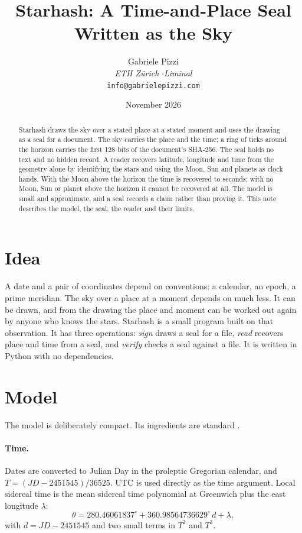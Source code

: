 \documentclass[10pt,twocolumn,a4paper]{article}
\title{\textbf{Starhash: A Time-and-Place Seal Written as the Sky}}
\author{Gabriele Pizzi\\
\textit{ETH Z\"urich} \quad$\cdot$\quad \textit{Liminal}\\
\texttt{info@gabrielepizzi.com}}
\date{November 2026}
\begin{document}
\maketitle

\begin{abstract}
\noindent Starhash draws the sky over a stated place at a stated moment and
uses the drawing as a seal for a document. The sky carries the place and the
time; a ring of ticks around the horizon carries the first 128 bits of the
document's SHA-256. The seal holds no text and no hidden record. A reader
recovers latitude, longitude and time from the geometry alone by identifying
the stars and using the Moon, Sun and planets as clock hands. With the Moon
above the horizon the time is recovered to seconds; with no Moon, Sun or
planet above the horizon it cannot be recovered at all. The model is small
and approximate, and a seal records a claim rather than proving it. This note
describes the model, the seal, the reader and their limits.
\end{abstract}

\section{Idea}

A date and a pair of coordinates depend on conventions: a calendar, an epoch,
a prime meridian. The sky over a place at a moment depends on much less. It
can be drawn, and from the drawing the place and moment can be worked out
again by anyone who knows the stars. Starhash is a small program built on
that observation. It has three operations: \emph{sign} draws a seal for a
file, \emph{read} recovers place and time from a seal, and \emph{verify}
checks a seal against a file. It is written in Python with no dependencies.

\section{Model}

The model is deliberately compact. Its ingredients are standard
\cite{meeus1998astronomical}.

\paragraph{Time.} Dates are converted to Julian Day in the proleptic
Gregorian calendar, and $T=(\mathit{JD}-2451545)/36525$. UTC is used
directly as the time argument. Local sidereal time is the mean sidereal
time polynomial at Greenwich plus the east longitude $\lambda$:
\begin{equation}
\theta = 280.46061837^\circ + 360.98564736629^\circ\,d + \lambda ,
\end{equation}
with $d=\mathit{JD}-2451545$ and two small terms in $T^2$ and $T^3$.
\end{document}
